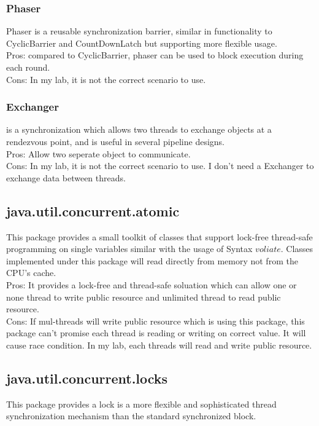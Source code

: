 \documentclass[10pt, a4paper]{IEEEtran}
\begin{document}
    \subsubsection{Phaser}
    Phaser is a reusable synchronization barrier, similar in functionality to CyclicBarrier and CountDownLatch but supporting more flexible usage.\\
    Pros: compared to CyclicBarrier, phaser can be used to block execution during each round.\\
    Cons: In my lab, it is not the correct scenario to use. \\
    \subsubsection{Exchanger}
    is a synchronization which allows two threads to exchange objects at a rendezvous point, and is useful in several pipeline designs.\\
    Pros: Allow two seperate object to communicate.\\
    
    Cons: In my lab, it is not the correct scenario to use. I don't need a Exchanger to exchange data between threads.\\
    \subsection{java.util.concurrent.atomic}
    This package provides a small toolkit of classes that support lock-free thread-safe programming on single variables similar with the usage of Syntax $voliate$. Classes implemented under this package will read directly from memory not from the CPU's cache.\\
    
    Pros: It provides a lock-free and thread-safe soluation which can allow one or none thread to write public resource and unlimited thread to read public resource.\\
    
    Cons: If mul-threads will write public resource which is using this package, this package can't promise each thread is reading or writing on correct value. It will cause race condition. In my lab, each threads will read and write public resource.\\
    \subsection{java.util.concurrent.locks}
    This package provides a lock is a more flexible and sophisticated thread synchronization mechanism than the standard synchronized block.\\
    
\end{document}
